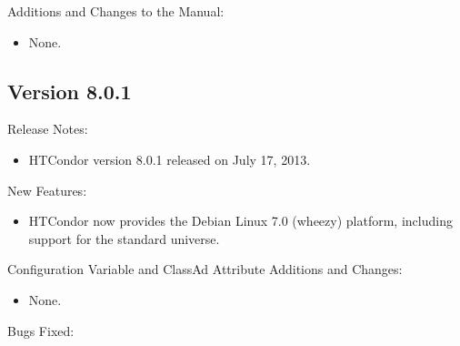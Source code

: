 \noindent Additions and Changes to the Manual:

\begin{itemize}

\item None.

\end{itemize}


\subsection*{\label{sec:New-8-0-1}Version 8.0.1}

\noindent Release Notes:

\begin{itemize}

\item HTCondor version 8.0.1 released on July 17, 2013.

\end{itemize}


\noindent New Features:

\begin{itemize}

\item HTCondor now provides the Debian Linux 7.0 (wheezy) platform,
including support for the standard universe.

\end{itemize}

\noindent Configuration Variable and ClassAd Attribute Additions and Changes:

\begin{itemize}

\item None.

\end{itemize}

\noindent Bugs Fixed:

